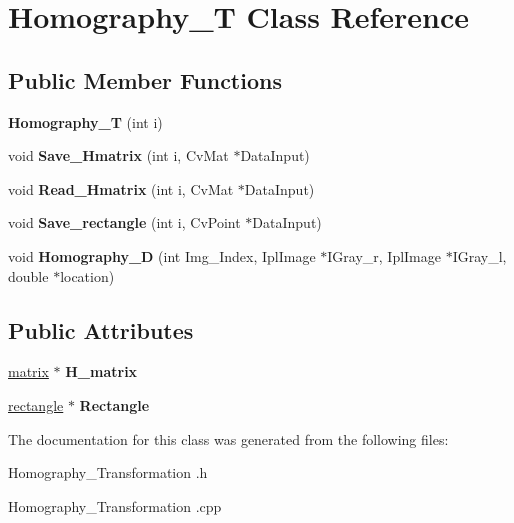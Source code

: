 \hypertarget{class_homography___t}{\section{Homography\-\_\-\-T Class Reference}
\label{class_homography___t}
}
\subsection*{Public Member Functions}
\begin{DoxyCompactItemize}
\item 
\hypertarget{class_homography___t_aa0ffb3ca67c80647f188900b7efce0e8}{{\bfseries Homography\-\_\-\-T} (int i)}\label{class_homography___t_aa0ffb3ca67c80647f188900b7efce0e8}

\item 
\hypertarget{class_homography___t_a9fc3e77bee1c5cfa5676411dd163e14d}{void {\bfseries Save\-\_\-\-Hmatrix} (int i, Cv\-Mat $\ast$Data\-Input)}\label{class_homography___t_a9fc3e77bee1c5cfa5676411dd163e14d}

\item 
\hypertarget{class_homography___t_a9c68bec5a5f25286ab81512283332f54}{void {\bfseries Read\-\_\-\-Hmatrix} (int i, Cv\-Mat $\ast$Data\-Input)}\label{class_homography___t_a9c68bec5a5f25286ab81512283332f54}

\item 
\hypertarget{class_homography___t_a87f03f9c4acad97b8c57d4cf4094e1a3}{void {\bfseries Save\-\_\-rectangle} (int i, Cv\-Point $\ast$Data\-Input)}\label{class_homography___t_a87f03f9c4acad97b8c57d4cf4094e1a3}

\item 
\hypertarget{class_homography___t_a6e13194574293b1db52979f385184bd1}{void {\bfseries Homography\-\_\-D} (int Img\-\_\-\-Index, Ipl\-Image $\ast$I\-Gray\-\_\-r, Ipl\-Image $\ast$I\-Gray\-\_\-l, double $\ast$location)}\label{class_homography___t_a6e13194574293b1db52979f385184bd1}

\end{DoxyCompactItemize}
\subsection*{Public Attributes}
\begin{DoxyCompactItemize}
\item 
\hypertarget{class_homography___t_a63ffb42304a19fc10610e479111718e6}{\hyperlink{structmatrix}{matrix} $\ast$ {\bfseries H\-\_\-matrix}}\label{class_homography___t_a63ffb42304a19fc10610e479111718e6}

\item 
\hypertarget{class_homography___t_a631f3b0abc9b5f43529e36c9f49e93c7}{\hyperlink{structrectangle}{rectangle} $\ast$ {\bfseries Rectangle}}\label{class_homography___t_a631f3b0abc9b5f43529e36c9f49e93c7}

\end{DoxyCompactItemize}


The documentation for this class was generated from the following files\-:\begin{DoxyCompactItemize}
\item 
Homography\-\_\-\-Transformation .\-h\item 
Homography\-\_\-\-Transformation .\-cpp\end{DoxyCompactItemize}

